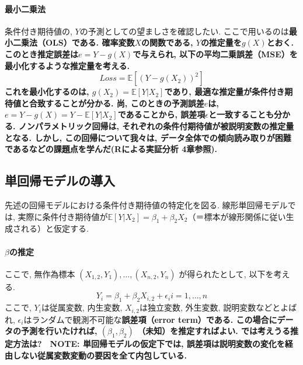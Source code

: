 \documentclass[paper=a4paper,fontsize=10pt]{jlreq}
\begin{document}
\paragraph{最小二乗法}
条件付き期待値の, $Y$の予測としての望ましさを確認したい. ここで用いるのは\rmfamily\mcfamily\bfseries{最小二乗法（OLS）}\mdseries である. 確率変数$X$の関数である, $Y$の推定量を$g(X)$とおく. このとき\rmfamily\mcfamily\bfseries{推定誤差}\mdseries は$e=Y-g(X)$で与えられ, 以下の平均二乗誤差（MSE）を最小化するような推定量を考える.
\begin{equation*}
  Loss=\mathbb{E}[(Y-g(X_2))^{2}]
\end{equation*}
これを最小化するのは, $g(X_2)=\mathbb{E}[Y|X_{2}]$であり, 最適な推定量が条件付き期待値と合致することが分かる. 尚, このときの予測誤差$e$は, $e=Y-g(X)=Y-\mathbb{E}[Y|X_{2}]$であることから, 誤差項$\epsilon$と一致することも分かる. ノンパラメトリック回帰は, それぞれの条件付期待値が被説明変数の推定量となる. しかし, この回帰について我々は, データ全体での傾向読み取りが困難であるなどの課題点を学んだ(Rによる実証分析 4章参照).\\

\subsection{単回帰モデルの導入}
先述の回帰モデルにおける条件付き期待値の特定化を図る. 線形単回帰モデルでは, 実際に条件付き期待値が$\mathbb{E}[Y|X_{2}]=\beta_1+\beta_2X_{2}$（＝標本が線形関係に従い生成される）と仮定する. \\

\paragraph{$\beta$の推定}
ここで, 無作為標本 $(X_{1,2}, Y_1), \dots, (X_{n,2}, Y_n)$ が得られたとして, 以下を考える.
\begin{equation*}
  Y_i = \beta_1+\beta_2X_{i,2}+\epsilon_i　i=1,\dots, n
\end{equation*}
ここで, $Y_i$は従属変数, 内生変数, $X_{i,2}$は独立変数, 外生変数, 説明変数などとよばれ, $\epsilon_i$はランダムで観測不可能な\rmfamily\mcfamily\bfseries{誤差項（error term）}\mdseries である. この場合にデータの予測を行いたければ, $(\beta_1, \beta_2)$ （未知）を推定すればよい. では考えうる推定方法は?　\rmfamily\mcfamily\bfseries{NOTE}\mdseries : 単回帰モデルの仮定下では, 誤差項は説明変数の変化を経由しない従属変数変動の要因を全て内包している.\\
\end{document}
